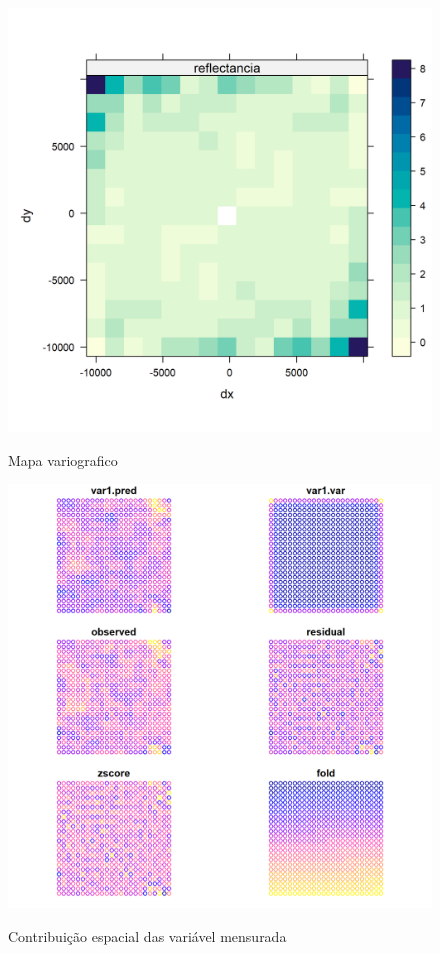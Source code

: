  			\begin{minipage}[t!]{0.31\textwidth}
 				
 				\begin{figure}[H]
 					\centering \small \caption{Mapa variografico}
 					\includegraphics[width=0.97\linewidth]{FIGURAS/varexpmap}
 					\label{fig:mapavariografico}
 				\end{figure}			
 				
 			\end{minipage} 
 			\begin{minipage}[t!]{0.31\textwidth}
 				
 				\begin{figure}[H]
 					\centering \small \caption{Contribuição espacial das variável mensurada}
 					\includegraphics[width=0.97\linewidth]{FIGURAS/xvalid.sph-map}
 					\label{fig:Rplothddg}
 				\end{figure}		
 			\end{minipage} 
 			
